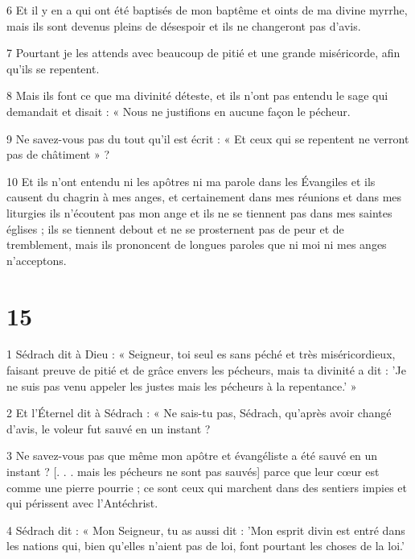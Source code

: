 \par 6 Et il y en a qui ont été baptisés de mon baptême et oints de ma divine myrrhe, mais ils sont devenus pleins de désespoir et ils ne changeront pas d'avis.

\par 7 Pourtant je les attends avec beaucoup de pitié et une grande miséricorde, afin qu'ils se repentent.

\par 8 Mais ils font ce que ma divinité déteste, et ils n'ont pas entendu le sage qui demandait et disait : « Nous ne justifions en aucune façon le pécheur.

\par 9 Ne savez-vous pas du tout qu'il est écrit : « Et ceux qui se repentent ne verront pas de châtiment » ?

\par 10 Et ils n'ont entendu ni les apôtres ni ma parole dans les Évangiles et ils causent du chagrin à mes anges, et certainement dans mes réunions et dans mes liturgies ils n'écoutent pas mon ange et ils ne se tiennent pas dans mes saintes églises ; ils se tiennent debout et ne se prosternent pas de peur et de tremblement, mais ils prononcent de longues paroles que ni moi ni mes anges n'acceptons.

\chapter{15}

\par 1 Sédrach dit à Dieu : « Seigneur, toi seul es sans péché et très miséricordieux, faisant preuve de pitié et de grâce envers les pécheurs, mais ta divinité a dit : 'Je ne suis pas venu appeler les justes mais les pécheurs à la repentance.' »

\par 2 Et l'Éternel dit à Sédrach : « Ne sais-tu pas, Sédrach, qu'après avoir changé d'avis, le voleur fut sauvé en un instant ?

\par 3 Ne savez-vous pas que même mon apôtre et évangéliste a été sauvé en un instant ? [. . . mais les pécheurs ne sont pas sauvés] parce que leur cœur est comme une pierre pourrie ; ce sont ceux qui marchent dans des sentiers impies et qui périssent avec l’Antéchrist.

\par 4 Sédrach dit : « Mon Seigneur, tu as aussi dit : 'Mon esprit divin est entré dans les nations qui, bien qu'elles n'aient pas de loi, font pourtant les choses de la loi.'

